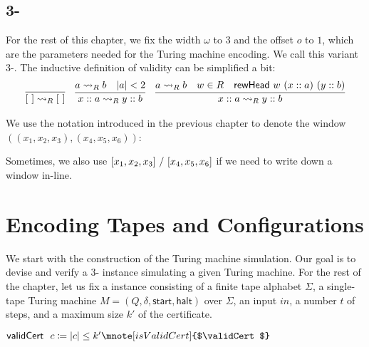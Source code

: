 \subsection{3-\PR{}}\label{sec:3pr}
For the rest of this chapter, we fix the width $\omega$ to $3$ and the offset $o$ to $1$, which are the parameters needed for the Turing machine encoding. We call this variant 3-\PR{}. 
The inductive definition of validity can be simplified a bit:
\begin{align*}
  \infer{\nil \strent{R} \nil}{} \quad
  \infer{x::a \strent{R} y ::b}{a \strent{R} b \quad \length{a} < 2} \quad
  \infer{x::a \strent{R} y :: b}{a \strent{R} b \quad w \in R \quad \rewHead{w}{(x::a)}{(y::b)}}
\end{align*}

We use the notation introduced in the previous chapter to denote the window $((x_1, x_2, x_3), (x_4, x_5, x_6))$: 
\begin{center}
\end{center}
Sometimes, we also use $[x_1, x_2, x_3]~/~[x_4, x_5, x_6]$ if we need to write down a window in-line.

\section{Encoding Tapes and Configurations}
We start with the construction of the Turing machine simulation. Our goal is to devise and verify a 3-\PR{} instance simulating a given Turing machine. 
For the rest of the chapter, let us fix a \gennp{} instance consisting of a finite tape alphabet $\Sigma$, a single-tape Turing machine $M = (Q, \delta, \textsf{start}, \textsf{halt})$ over $\Sigma$, an input $in$, a number $t$ of steps, and a maximum size $k'$ of the certificate. 

\begin{definition}
  $\validCert~c \defeq \length{c} \le k' \mnote[isValidCert]{$\validCert$}$
\end{definition}

